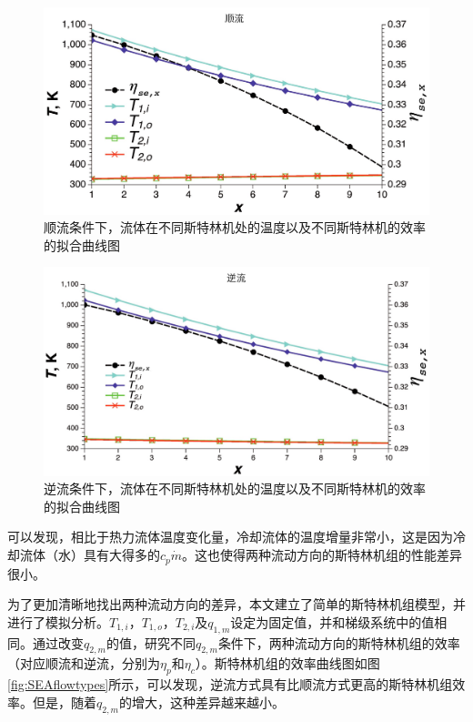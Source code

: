 \noindent \begin{figure}[htbp]
\begin{center}
	\includegraphics[width = 0.8\columnwidth, angle = 0]{fig/Parallelflow}
	\caption{顺流条件下，流体在不同斯特林机处的温度以及不同斯特林机的效率的拟合曲线图}
	\label{fig:Parallelflow}
\end{center}
\end{figure}
\noindent \begin{figure}[H]
\begin{center}
	\includegraphics[width = 0.8\columnwidth, angle = 0]{fig/Counterflow}
	\caption{逆流条件下，流体在不同斯特林机处的温度以及不同斯特林机的效率的拟合曲线图}
	\label{fig:Counterflow}
\end{center}
\end{figure}

可以发现，相比于热力流体温度变化量，冷却流体的温度增量非常小，这是因为冷却流体（水）具有大得多的$c_p\dot{m}$。这也使得两种流动方向的斯特林机组的性能差异很小。

为了更加清晰地找出两种流动方向的差异，本文建立了简单的斯特林机组模型，并进行了模拟分析。$T_{1,i}，T_{1,o}，T_{2,i}及q_{1,m}$设定为固定值，并和梯级系统中的值相同。通过改变$q_{2,m}$的值，研究不同$q_{2,m}$条件下，两种流动方向的斯特林机组的效率（对应顺流和逆流，分别为$\eta_p$和$\eta_c$）。斯特林机组的效率曲线图如图\ref{fig:SEAflowtypes}所示，可以发现，逆流方式具有比顺流方式更高的斯特林机组效率。但是，随着$q_{2,m}$的增大，这种差异越来越小。


